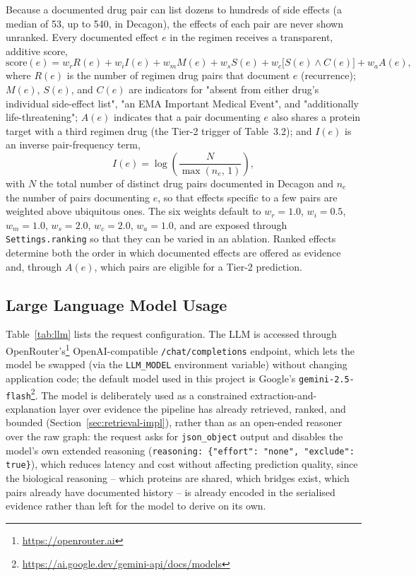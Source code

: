\documentclass[11pt]{report}
\begin{document}
Because a documented drug pair can list dozens to hundreds of side effects
(a median of 53, up to 540, in Decagon), the effects of each pair are never
shown unranked. Every documented effect $e$ in the regimen receives a
transparent, additive score,
\begin{equation}
  \mathrm{score}(e) = w_r R(e) + w_i I(e) + w_m M(e) + w_s S(e)
                     + w_c\big[S(e)\wedge C(e)\big] + w_a A(e),
  \label{eq:score}
\end{equation}
where $R(e)$ is the number of regimen drug pairs that document $e$
(recurrence); $M(e)$, $S(e)$, and $C(e)$ are indicators for "absent from
either drug's individual side-effect list", "an EMA Important Medical
Event", and "additionally life-threatening"; $A(e)$ indicates that a pair
documenting $e$ also shares a protein target with a third regimen drug (the
Tier-2 trigger of Table~3.2); and $I(e)$ is an inverse pair-frequency term,
\begin{equation}
  I(e) = \log\!\left(\frac{N}{\max(n_e,\,1)}\right),
  \label{eq:idf}
\end{equation}
with $N$ the total number of distinct drug pairs documented in Decagon and
$n_e$ the number of pairs documenting $e$, so that effects specific to a
few pairs are weighted above ubiquitous ones. The six weights default to
$w_r{=}1.0$, $w_i{=}0.5$, $w_m{=}1.0$, $w_s{=}2.0$, $w_c{=}2.0$, $w_a{=}1.0$,
and are exposed through \texttt{Settings.ranking} so that they can be varied
in an ablation. Ranked effects determine both the order in which documented
effects are offered as evidence and, through $A(e)$, which pairs are
eligible for a Tier-2 prediction.

\subsection{Large Language Model Usage}
\label{sec:llm-usage}

Table~\ref{tab:llm} lists the request configuration. The LLM is accessed
through OpenRouter's\footnote{\url{https://openrouter.ai}} OpenAI-compatible
\texttt{/chat/completions} endpoint, which lets the model be swapped (via
the \texttt{LLM\_MODEL} environment variable) without changing application
code; the default model used in this project is Google's
\texttt{gemini-2.5-flash}\footnote{\url{https://ai.google.dev/gemini-api/docs/models}}.
The model is deliberately used as a constrained extraction-and-explanation
layer over evidence the pipeline has already retrieved, ranked, and bounded
(Section~\ref{sec:retrieval-impl}), rather than as an open-ended reasoner
over the raw graph: the request asks for \texttt{json\_object} output and
disables the model's own extended reasoning
(\texttt{reasoning: \{"effort": "none", "exclude": true\}}), which reduces
latency and cost without affecting prediction quality, since the biological
reasoning -- which proteins are shared, which bridges exist, which pairs
already have documented history -- is already encoded in the serialised
evidence rather than left for the model to derive on its own.
\end{document}
